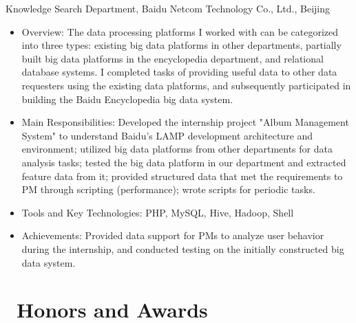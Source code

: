 \documentclass{resume}
\begin{document}
Knowledge Search Department, Baidu Netcom Technology Co., Ltd., Beijing
\begin{itemize}
\item Overview: The data processing platforms I worked with can be categorized into three types: existing big data platforms in other departments, partially built big data platforms in the encyclopedia department, and relational database systems. I completed tasks of providing useful data to other data requesters using the existing data platforms, and subsequently participated in building the Baidu Encyclopedia big data system.
\item Main Responsibilities: Developed the internship project "Album Management System" to understand Baidu's LAMP development architecture and environment; utilized big data platforms from other departments for data analysis tasks; tested the big data platform in our department and extracted feature data from it; provided structured data that met the requirements to PM through scripting (performance); wrote scripts for periodic tasks.
\item Tools and Key Technologies: PHP, MySQL, Hive, Hadoop, Shell
\item Achievements: Provided data support for PMs to analyze user behavior during the internship, and conducted testing on the initially constructed big data system.
\end{itemize}

\section{\faHeartO\ Honors and Awards}
\end{document}
